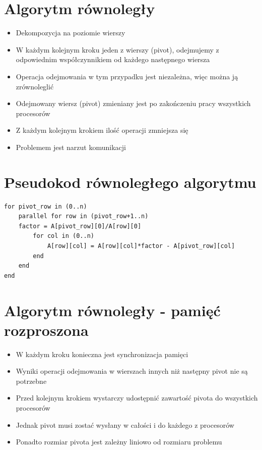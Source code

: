 \documentclass{beamer}
\begin{document}
	\section{Algorytm równoległy}
	\begin{frame}
		\begin{itemize}
			\item Dekompozycja na poziomie wierszy
			\item W każdym kolejnym kroku jeden z wierszy (pivot), odejmujemy z odpowiednim współczynnikiem od każdego następnego wiersza
			\item Operacja odejmowania w tym przypadku jest niezależna, więc można ją zrównoleglić
			\item Odejmowany wiersz (pivot) zmieniany jest po zakończeniu pracy wszystkich procesorów
			\item Z każdym kolejnym krokiem ilość operacji zmniejsza się
			\item Problemem jest narzut komunikacji
		\end{itemize}
	\end{frame}
	
	\section{Pseudokod równoległego algorytmu}
	\begin{frame}[fragile]	

\begin{semiverbatim}
\scriptsize
\begin{lstlisting}
for pivot_row in (0..n)
    parallel for row in (pivot_row+1..n)
    factor = A[pivot_row][0]/A[row][0]
        for col in (0..n)
            A[row][col] = A[row][col]*factor - A[pivot_row][col]
        end
    end
end
\end{lstlisting}
\end{semiverbatim}
	\end{frame}
	
	\section{Algorytm równoległy - pamięć rozproszona}
	\begin{frame}
		\begin{itemize}
			\item W każdym kroku konieczna jest synchronizacja pamięci
			\item Wyniki operacji odejmowania w wierszach innych niż następny pivot nie są potrzebne
			\item Przed kolejnym krokiem wystarczy udostępnić zawartość pivota do wszystkich procesorów
			\item Jednak pivot musi zostać wysłany w całości i do każdego z procesorów
			\item Ponadto rozmiar pivota jest zależny liniowo od rozmiaru problemu
		\end{itemize}
	\end{frame}
	
\end{document}
